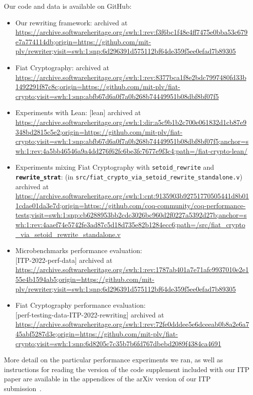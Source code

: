 \documentclass[sn-mathphys,pdflatex]{sn-jnl}%
\makeatletter
\let\@badhref=\href
\renewcommand{\href}[2]{\@badhref{#2}{#1}}
\newcommand{\tacsetoidrewrite}{\texttt{setoid_rewrite}}
\newcommand{\tacrewritestrat}{\textbf{\texttt{rewrite\_strat}}}
\theoremstyle{thmstyleone}%
\theoremstyle{thmstyletwo}%
\theoremstyle{thmstylethree}%
\makeatother
\begin{document}
\newcommand{\archivedatswh}[2][]{archived at \\ \href{https://archive.softwareheritage.org/#2#1}{#2}}
Our code and data is available on GitHub:
\begin{itemize}
\item
  Our rewriting framework:  \archivedatswh[;origin=https://github.com/mit-plv/rewriter;visit=swh:1:snp:6d296391d575112bf64de359f5ee0efad7b89305]{swh:1:rev:f3f6bc1f48e4ff7475e0bba53c679e7a774114db}
\item
  Fiat Cryptography:  \archivedatswh[;origin=https://github.com/mit-plv/fiat-crypto;visit=swh:1:snp:abfb67d6a0f7a0b268b74449951b08dbf8bf07f5]{swh:1:rev:8377bca1f8e2bdc7997480fd33b1492291f87c8c}
\item
  Experiments with Lean: [lean] \archivedatswh[;origin=https://github.com/mit-plv/fiat-crypto;visit=swh:1:snp:abfb67d6a0f7a0b268b74449951b08dbf8bf07f5;anchor=swh:1:rev:4a5bb46546a9a4dd276f62fc6be3fc7677e9f3c4;path=/fiat-crypto-lean/]{swh:1:dir:a5c9b1b2c700e061832d1cb87e9348bd2815c5e2}
\item
  Experiments mixing Fiat Cryptography with \tacsetoidrewrite{} and \tacrewritestrat{}:  (in \texttt{src/fiat\_crypto\_via\_setoid\_rewrite\_standalone.v}) \archivedatswh[;origin=https://github.com/coq-community/coq-performance-tests;visit=swh:1:snp:cb6288953bb2cdc3026bc960d2f0227a5392d27b;anchor=swh:1:rev:4aaef74e5742fe3ad87c5d18d735e82b1284ecc6;path=/src/fiat_crypto_via_setoid_rewrite_standalone.v]{swh:1:cnt:9135903b92751770505441d8b011cdae01da3e7d}
\item
  Microbenchmarks performance evaluation: \\ [ITP-2022-perf-data] \archivedatswh[;origin=https://github.com/mit-plv/rewriter;visit=swh:1:snp:6d296391d575112bf64de359f5ee0efad7b89305]{swh:1:rev:1787ab401a7e71afc9937010e2e155e4b1594ab5}
\item
  Fiat Cryptography performance evaluation: \\ [perf-testing-data-ITP-2022-rewriting] \archivedatswh[;origin=https://github.com/mit-plv/fiat-crypto;visit=swh:1:snp:6d8205c7c35b7b6fd767dbebd2089f4384ca4691]{swh:1:rev:72fe0dddee5e6dceeab0b8a2e6a745abf5287d3e}
\end{itemize}
More detail on the particular performance experiments we ran, as well as instructions for reading the version of the code supplement included with our ITP paper are available in the appendices of the arXiv version of our ITP submission~\cite{RewritingITP2022}.
\end{document}
